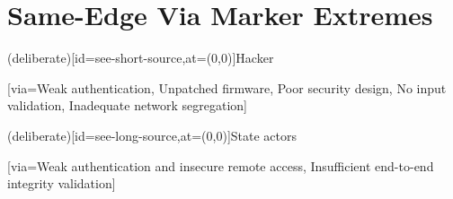 \documentclass[a4paper]{article}
\begin{document}
\section*{Same-Edge Via Marker Extremes}

\begin{center}
\begin{corasthreatdiagram}[x=1.35cm,y=1.35cm,layout=manual,min edge gap=8mm]
  \threat(deliberate)[id=see-short-source,at={(0,0)}]{Hacker}

  [via={Weak authentication, Unpatched firmware, Poor security design, No input validation, Inadequate network segregation}]
\end{corasthreatdiagram}
\end{center}

\newpage

\begin{center}
\begin{corasthreatdiagram}[x=1.05cm,y=1.05cm,layout=manual,min edge gap=8mm]
  \threat(deliberate)[id=see-long-source,at={(0,0)}]{State actors}

  [via={Weak authentication and insecure remote access, Insufficient end-to-end integrity validation}]
\end{corasthreatdiagram}
\end{center}
\end{document}
